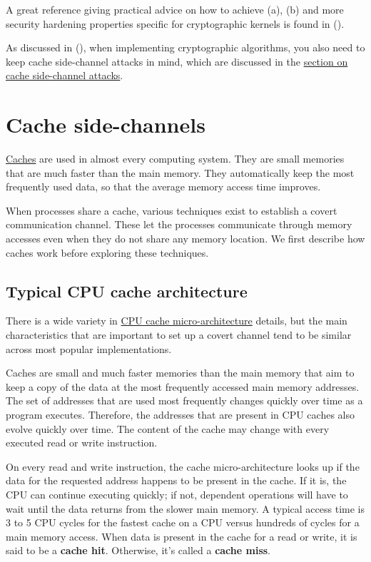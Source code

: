 \documentclass[
  a4paper,
]{report}
\begin{document}
A great reference giving practical advice on how to achieve (a), (b) and
more security hardening properties specific for cryptographic kernels is
found in ().

As discussed in (), when
implementing cryptographic algorithms, you also need to keep cache
side-channel attacks in mind, which are discussed in the
\hyperref[cache-side-channel-attacks]{section on cache side-channel
attacks}.

\section{Cache side-channels}\label{cache-side-channels}

\href{https://en.wikipedia.org/wiki/Cache_(computing)}{\label{__index_entry_103}{Caches}}
are used in almost every computing system. They are small memories that
are much faster than the main memory. They automatically keep the most
frequently used data, so that the average memory access time improves.

When processes share a cache, various techniques exist to establish a
covert communication channel. These let the processes communicate
through memory accesses even when they do not share any memory location.
We first describe how caches work before exploring these techniques.

\subsection{Typical CPU cache
architecture}\label{typical-cpu-cache-architecture}

There is a wide variety in
\href{https://en.wikipedia.org/wiki/CPU_cache}{CPU cache
micro-architecture} details, but the main characteristics that are
important to set up a covert channel tend to be similar across most
popular implementations.

Caches are small and much faster memories than the main memory that aim
to keep a copy of the data at the most frequently accessed main memory
addresses. The set of addresses that are used most frequently changes
quickly over time as a program executes. Therefore, the addresses that
are present in CPU caches also evolve quickly over time. The content of
the cache may change with every executed read or write instruction.

On every read and write instruction, the cache micro-architecture looks
up if the data for the requested address happens to be present in the
cache. If it is, the CPU can continue executing quickly; if not,
dependent operations will have to wait until the data returns from the
slower main memory. A typical
\label{__index_entry_104}{access
time} is 3 to 5 CPU cycles for the fastest
cache on a CPU versus hundreds of cycles for a main memory access. When
data is present in the cache for a read or write, it is said to be a
\textbf{\label{__index_entry_105}{cache
hit}}. Otherwise, it's called a
\textbf{\label{__index_entry_106}{cache
miss}}.
\end{document}
